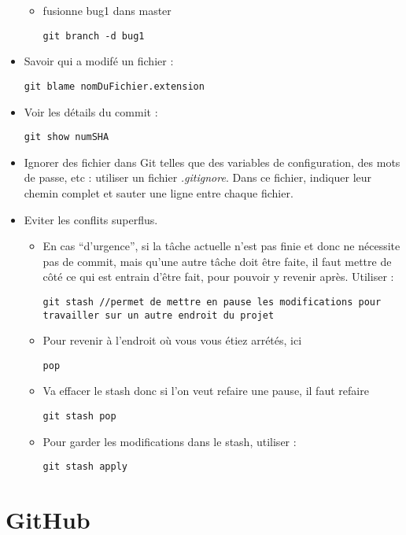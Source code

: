 \documentclass[12pt,a4paper]{article}
\begin{document}
\begin{itemize}
\begin{itemize}
\item fusionne bug1 dans master
\begin{lstlisting}
git branch -d bug1
\end{lstlisting}
\end{itemize}
\item Savoir qui a modifé un fichier :
\begin{lstlisting}
git blame nomDuFichier.extension
\end{lstlisting}
\item Voir les détails du commit :
\begin{lstlisting}
git show numSHA
\end{lstlisting}
\item Ignorer des fichier dans Git telles que des variables de configuration, des mots de passe, etc : 
\newline utiliser un fichier \textit{.gitignore}. Dans ce fichier, indiquer leur chemin complet et sauter une ligne entre chaque fichier.
\item Eviter les conflits superflus. 
\begin{itemize} 
\item En cas “d’urgence”, si la tâche actuelle n’est pas finie et donc ne nécessite pas de commit, mais qu’une autre tâche doit être faite, il faut mettre de côté ce qui est entrain d’être fait, pour pouvoir y revenir après. Utiliser :
\begin{lstlisting}
git stash //permet de mettre en pause les modifications pour travailler sur un autre endroit du projet
\end{lstlisting}
\item Pour revenir à l'endroit où vous vous étiez arrétés, ici \begin{lstlisting}
pop
\end{lstlisting}
\item Va effacer le stash donc si l'on veut refaire une pause, il faut refaire
\begin{lstlisting}
git stash pop
\end{lstlisting}
\item Pour garder les modifications dans le stash, utiliser :
\begin{lstlisting}
git stash apply
\end{lstlisting}
\end{itemize}
\end{itemize}

\section{GitHub}
\end{document}
